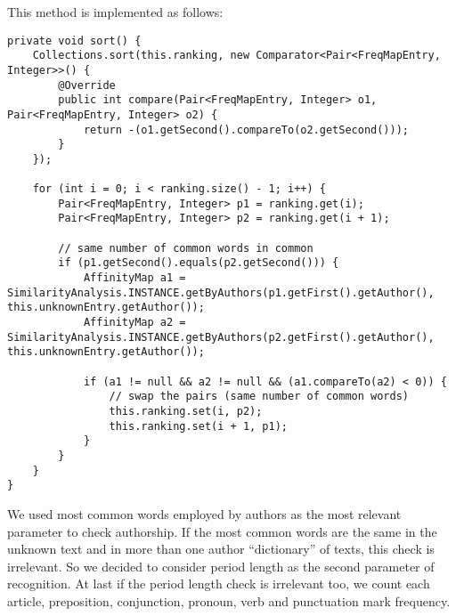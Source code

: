 \documentclass[a4paper,11pt, twoside]{article}
\begin{document}
		\noindent
		This method is implemented as follows:
		\begin{lstlisting}[firstnumber=32,caption={Ranking sort method}, captionpos=b, label={lst:sortmethod}]
private void sort() {
	Collections.sort(this.ranking, new Comparator<Pair<FreqMapEntry, Integer>>() {
		@Override
		public int compare(Pair<FreqMapEntry, Integer> o1, Pair<FreqMapEntry, Integer> o2) {
			return -(o1.getSecond().compareTo(o2.getSecond()));
		}
	});

	for (int i = 0; i < ranking.size() - 1; i++) {
		Pair<FreqMapEntry, Integer> p1 = ranking.get(i);
		Pair<FreqMapEntry, Integer> p2 = ranking.get(i + 1);

		// same number of common words in common
		if (p1.getSecond().equals(p2.getSecond())) { 
			AffinityMap a1 = SimilarityAnalysis.INSTANCE.getByAuthors(p1.getFirst().getAuthor(), this.unknownEntry.getAuthor());
			AffinityMap a2 = SimilarityAnalysis.INSTANCE.getByAuthors(p2.getFirst().getAuthor(), this.unknownEntry.getAuthor());

			if (a1 != null && a2 != null && (a1.compareTo(a2) < 0)) {
				// swap the pairs (same number of common words)
				this.ranking.set(i, p2);
				this.ranking.set(i + 1, p1);
			}
		}
	}
}
		\end{lstlisting}

		\noindent
		We used most common words employed by authors as the most relevant parameter to check authorship. If the most common words are the same in the unknown text and in more than one author ``dictionary'' of texts, this check is irrelevant. So we decided to consider period length as the second parameter of recognition. At last if the period length check is irrelevant too, we count each article, preposition, conjunction, pronoun, verb and punctuation mark frequency.

		\bigskip
\end{document}

